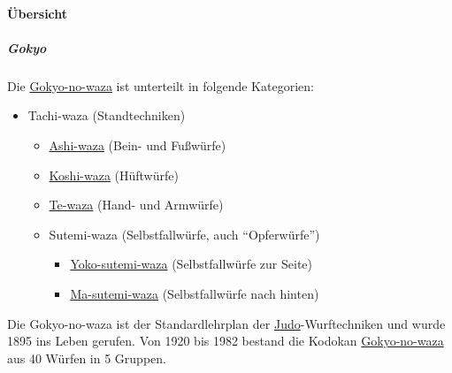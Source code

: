 \documentclass[justified, a4paper, notitlepage, captions=tableheading, nobib]{tufte-handout}
\begin{document}
\paragraph{Übersicht }
\label{sec:orga3ce38b}
\subparagraph{Gokyo}
\label{sec:orge6f8470}
Die \hyperref[orgb8b2097]{Gokyo-no-waza} ist unterteilt in folgende Kategorien:

\begin{itemize}
\item \label{org70d3c4a}Tachi-waza (Standtechniken)
\begin{itemize}
\item \hyperref[orge923066]{Ashi-waza} (Bein- und Fußwürfe)
\item \hyperref[org455a0af]{Koshi-waza} (Hüftwürfe)
\item \hyperref[org6c92a82]{Te-waza} (Hand- und Armwürfe)
\item Sutemi-waza (Selbstfallwürfe, auch "`Opferwürfe"')
\begin{itemize}
\item \hyperref[orgeedc698]{Yoko-sutemi-waza} (Selbstfallwürfe zur Seite)
\item \hyperref[org2b26d8f]{Ma-sutemi-waza} (Selbstfallwürfe nach hinten)
\end{itemize}
\end{itemize}
\end{itemize}

Die \label{orgb8b2097}Gokyo-no-waza ist der Standardlehrplan der \hyperref[org39a3ee2]{Judo}-Wurftechniken und wurde 1895 ins Leben gerufen. Von 1920 bis 1982 bestand die Kodokan \hyperref[orgb8b2097]{Gokyo-no-waza} aus 40 Würfen in 5 Gruppen.
\end{document}
